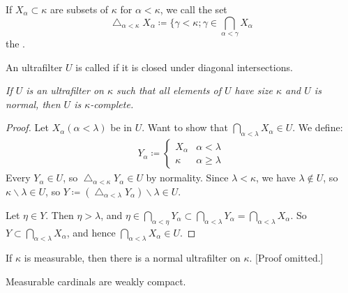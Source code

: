 \documentclass[]{article}
\newcommand{\tri}{\mathop{\triangle}}
\begin{document}
\begin{defin*}
    If $X_\alpha \subset \kappa$ are subsets of $\kappa$ for $\alpha < \kappa$, we call the set $$
    \tri_{\alpha < \kappa}X_\alpha \coloneqq \{\gamma < \kappa; \gamma \in \bigcap_{\alpha <\gamma}X_\alpha$$ the .
\end{defin*}
\begin{defin*}
    An ultrafilter $U$ is called  if it is closed under diagonal intersections.
\end{defin*}
\begin{remark*}[Proposition]
    \emph{
        If $U$ is an ultrafilter on $\kappa$ such that all elements of $U$ have size $\kappa$ and $U$ is normal, then $U$ is $\kappa$-complete.
    }
\end{remark*}
\begin{proof}
    Let $X_\alpha (\alpha < \lambda)$ be in $U$. Want to show that $\bigcap_{\alpha < \lambda}X_\alpha \in U$. We define:
    \begin{align*}
        Y_\alpha \coloneqq \left\lbrace \begin{array}{cl}X_\alpha & \alpha < \lambda \\ \kappa & \alpha \ge \lambda \end{array}\right.
    \end{align*}
    Every $Y_\alpha \in U$, so $\tri_{\alpha < \kappa}Y_\alpha \in U$ by normality. Since $\lambda < \kappa$, we have $\lambda \not\in U$, so $\kappa\backslash \lambda \in U$, so $Y\coloneqq (\tri_{\alpha < \lambda}Y_\alpha)\backslash \lambda \in U$.

    Let $\eta \in Y$. Then $\eta > \lambda$, and $\eta \in \bigcap_{\alpha < \eta}Y_\alpha \subset \bigcap_{\alpha < \lambda}Y_\alpha = \bigcap_{\alpha < \lambda}X_\alpha$. So $Y\subset \bigcap_{\alpha < \lambda}X_\alpha$, and hence $\bigcap_{\alpha < \lambda}X_\alpha \in U$.
\end{proof}
\begin{remark*}
    If $\kappa$ is measurable, then there is a normal ultrafilter on $\kappa$. [Proof omitted.]
\end{remark*}
\begin{theorem*}[ZFC]
    Measurable cardinals are weakly compact.
\end{theorem*}
\end{document}
